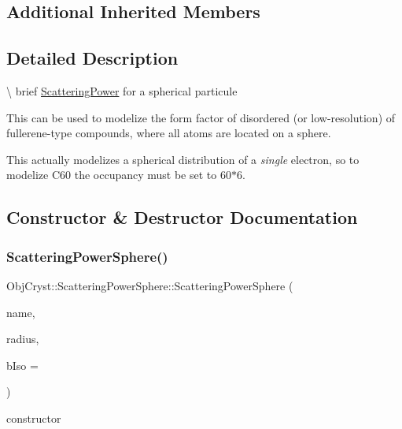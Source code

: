\subsection*{Additional Inherited Members}


\subsection{Detailed Description}
\textbackslash{} brief \mbox{\hyperlink{class_obj_cryst_1_1_scattering_power}{Scattering\+Power}} for a spherical particule

This can be used to modelize the form factor of disordered (or low-\/resolution) of fullerene-\/type compounds, where all atoms are located on a sphere.

This actually modelizes a spherical distribution of a {\itshape single} electron, so to modelize C60 the occupancy must be set to 60$\ast$6. 

\subsection{Constructor \& Destructor Documentation}
\mbox{\label{class_obj_cryst_1_1_scattering_power_sphere_a2d50cba1b4405f52f1dd4148907a88c5}} 
\subsubsection{\texorpdfstring{ScatteringPowerSphere()}{ScatteringPowerSphere()}}
{\footnotesize\ttfamily Obj\+Cryst\+::\+Scattering\+Power\+Sphere\+::\+Scattering\+Power\+Sphere (\begin{DoxyParamCaption}\item[{const string \&}]{name,  }\item[{const R\+E\+AL}]{radius,  }\item[{const R\+E\+AL}]{b\+Iso = {} }\end{DoxyParamCaption})}



constructor 



